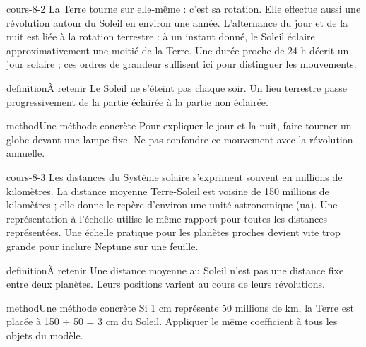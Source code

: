 \documentclass[12pt,twoside,openany]{book}
\begin{document}
\label{ch-8-cours-2}
\begin{pcFiche}{cours-8-2}
La Terre tourne sur elle-même : c’est sa rotation. Elle effectue aussi une révolution autour du Soleil en environ une année. L’alternance du jour et de la nuit est liée à la rotation terrestre : à un instant donné, le Soleil éclaire approximativement une moitié de la Terre. Une durée proche de 24 h décrit un jour solaire ; ces ordres de grandeur suffisent ici pour distinguer les mouvements.\par
{}
\begin{pcEncadre}{definition}{À retenir}
Le Soleil ne s’éteint pas chaque soir. Un lieu terrestre passe progressivement de la partie éclairée à la partie non éclairée.\par
\end{pcEncadre}
\begin{pcEncadre}{method}{Une méthode concrète}
Pour expliquer le jour et la nuit, faire tourner un globe devant une lampe fixe. Ne pas confondre ce mouvement avec la révolution annuelle.\par
\end{pcEncadre}
\end{pcFiche}
\label{ch-8-cours-3}
\begin{pcFiche}{cours-8-3}
Les distances du Système solaire s’expriment souvent en millions de kilomètres. La distance moyenne Terre-Soleil est voisine de 150 millions de kilomètres ; elle donne le repère d’environ une unité astronomique (ua). Une représentation à l’échelle utilise le même rapport pour toutes les distances représentées. Une échelle pratique pour les planètes proches devient vite trop grande pour inclure Neptune sur une feuille.\par
{}
\begin{pcEncadre}{definition}{À retenir}
Une distance moyenne au Soleil n’est pas une distance fixe entre deux planètes. Leurs positions varient au cours de leurs révolutions.\par
\end{pcEncadre}
\begin{pcEncadre}{method}{Une méthode concrète}
Si 1 cm représente 50 millions de km, la Terre est placée à 150 \(\div\) 50 = 3 cm du Soleil. Appliquer le même coefficient à tous les objets du modèle.\par
\end{pcEncadre}
\end{pcFiche}
\end{document}

